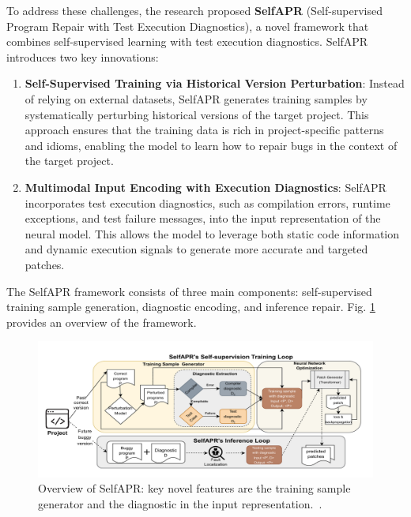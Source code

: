 \documentclass[manuscript,screen,review]{acmart}
\begin{document}
To address these challenges, the research proposed \textbf{SelfAPR} (Self-supervised Program Repair with Test Execution Diagnostics)\cite{selfapr_paper}, a novel framework that combines self-supervised learning with test execution diagnostics. SelfAPR introduces two key innovations:

\begin{enumerate}
\item \textbf{Self-Supervised Training via Historical Version Perturbation}: Instead of relying on external datasets, SelfAPR generates training samples by systematically perturbing historical versions of the target project. This approach ensures that the training data is rich in project-specific patterns and idioms, enabling the model to learn how to repair bugs in the context of the target project.

\item \textbf{Multimodal Input Encoding with Execution Diagnostics}: SelfAPR incorporates test execution diagnostics, such as compilation errors, runtime exceptions, and test failure messages, into the input representation of the neural model. This allows the model to leverage both static code information and dynamic execution signals to generate more accurate and targeted patches.
\end{enumerate}

The SelfAPR framework consists of three main components: self-supervised training sample generation, diagnostic encoding, and inference repair. Fig. \ref{fig:APRframework} provides an overview of the framework.

\begin{figure}[htbp]
  \centering
  \includegraphics[width=0.85\linewidth]{picture/APRframework.png}
  \caption{Overview of SelfAPR: key novel features are the training sample generator and the diagnostic in the input representation.~\cite{selfapr_paper}.}
  \label{fig:APRframework}
\end{figure}
\end{document}
